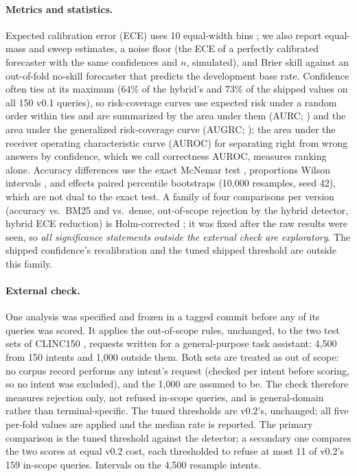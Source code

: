 \paragraph{Metrics and statistics.} Expected calibration error (ECE) uses 10 equal-width bins
\citep{naeini2015ece,guo2017calibration}; we also report equal-mass and sweep \citep{roelofs2022mitigating} estimates, a noise floor (the ECE of a
perfectly calibrated forecaster with the same confidences and $n$, simulated), and Brier skill
\citep{brier1950verification} against an out-of-fold no-skill forecaster that predicts the development base rate.
Confidence often ties at its maximum (64\% of the hybrid's and 73\% of the shipped values on all 150 v0.1
queries), so
risk-coverage curves use expected risk under a random order within ties and are summarized by the area under them (AURC; \citealp{geifman2019aurc}) and the area under the
generalized risk-coverage curve (AUGRC; \citealp{traub2024overcoming}); the area under the receiver
operating characteristic curve (AUROC) for separating right from wrong answers by confidence, which we call
correctness AUROC, measures ranking alone. Accuracy differences use the exact McNemar test \citep{mcnemar1947note}, proportions
Wilson intervals \citep{wilson1927probable}, and effects paired percentile bootstraps (10,000 resamples, seed 42),
which are not dual to the exact test. A family of four comparisons per version (accuracy vs.\ BM25 and vs.\ dense,
out-of-scope rejection by the hybrid detector, hybrid ECE reduction) is Holm-corrected \citep{holm1979simple}; it
was fixed after the raw results were seen, so \emph{all significance statements outside the external check are exploratory}. The shipped
confidence's recalibration and the tuned shipped threshold are outside this family.

\paragraph{External check.} One analysis was specified and frozen in a tagged commit before any of its
queries was scored. It applies the out-of-scope rules, unchanged, to the two test sets of CLINC150
\citep{larson-etal-2019-evaluation}, requests written for a general-purpose task assistant: 4,500 from 150
intents and 1,000 outside them. Both sets are treated as out of scope: no corpus record performs any intent's
request (checked per intent before scoring, so no intent was excluded), and the 1,000 are assumed to be. The
check therefore measures rejection only, not refused in-scope queries, and is general-domain rather than
terminal-specific. The tuned thresholds are v0.2's, unchanged; all five per-fold values are applied and the
median rate is reported. The primary comparison is the tuned threshold against the detector; a secondary one
compares the two scores at equal v0.2 cost, each thresholded to refuse at most 11 of v0.2's 159 in-scope
queries. Intervals on the 4,500 resample intents.

